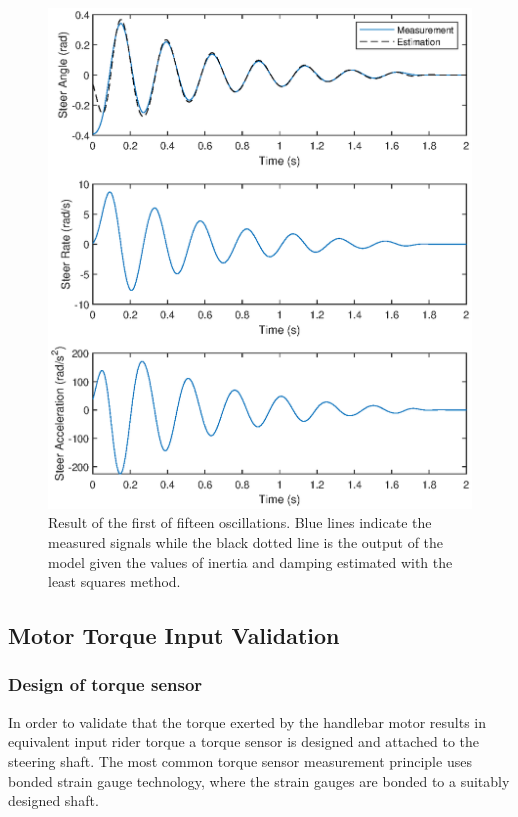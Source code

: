 \begin{figure}[h]
\centering
\captionsetup{justification=centering,margin=2cm}

\includegraphics[scale=0.8]{images/figure3.eps}
	\caption[Short title]{Result of the first of fifteen oscillations. Blue lines indicate the  measured signals while the black dotted line is the output of the model given the values of inertia and damping estimated with the least squares method.}
\label{fig:figure3}
\end{figure}


\newpage
\subsection{Motor Torque Input Validation} \label{sec:torqueSensor}

\subsubsection{Design of torque sensor}
In order to validate that the torque exerted by the handlebar motor results in equivalent input rider torque  a torque sensor is designed and attached to the steering shaft. The most common torque sensor measurement principle uses bonded strain gauge technology, where the strain gauges are bonded to a suitably designed shaft.

